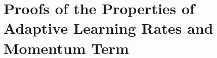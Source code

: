 \documentclass{article} %
\newtheorem{property}{\textbf{Property}}
\begin{document}
\section{Proofs of the Properties of Adaptive Learning Rates and Momentum Term}
\end{document}
